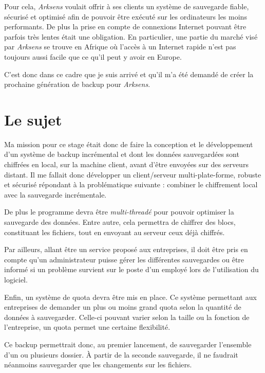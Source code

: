\documentclass[a4paper,10pt, twoside]{report}
\begin{document}
\begin{spacing}{1.2}
Pour cela, \textit{Arksens} voulait offrir \`a ses clients un syst\`eme de
sauvegarde fiable, s\'ecuris\'e et optimis\'e afin de pouvoir \^etre
ex\'ecut\'e sur les ordinateurs les moins performants. De plus la prise en
compte de connexions Internet pouvant \^etre parfois tr\`es lentes \'etait une
obligation. En particulier, une partie du march\'e vis\'e par \textit{Arksens}
se trouve en Afrique o\`u l'acc\`es \`a un Internet rapide n'est pas toujours
aussi facile que ce qu'il peut y avoir en Europe.

C'est donc dans ce cadre que je suis arriv\'e et qu'il m'a \'et\'e demand\'e
de cr\'eer la prochaine g\'en\'eration de backup pour \textit{Arksens}.

\section{Le sujet}
Ma mission pour ce stage \'etait donc de faire la conception et le
d\'eveloppement d'un syst\`eme de backup incr\'emental et dont les donn\'ees
sauvegard\'ees sont chiffr\'ees en local, sur la machine client, avant d'\^etre
envoy\'ees sur des serveurs distant. Il me fallait donc d\'evelopper un
client/serveur multi-plate-forme, robuste et s\'ecuris\'e r\'epondant \`a
la probl\'ematique suivante : combiner le chiffrement local avec la sauvegarde
incr\'ementale.

De plus le programme devra \^etre \textit{multi-thread\'e} pour pouvoir
optimiser la sauvegarde des donn\'ees. Entre autre, cela permettra de chiffrer
des blocs, constituant les fichiers, tout en envoyant au serveur ceux d\'ej\`a
chiffr\'es.

Par ailleurs, allant \^etre un service propos\'e aux entreprises, il doit \^etre
pris en compte qu'un administrateur puisse g\'erer les diff\'erentes
sauvegardes ou \^etre inform\'e si un probl\`eme survient sur le poste d'un
employ\'e lors de l'utilisation du logiciel.

Enfin, un syst\`eme de quota devra \^etre mis en place. Ce syst\`eme permettant
aux entreprises de demander un plus ou moins grand quota selon la quantit\'e de
donn\'ees \`a sauvegarder. Celle-ci pouvant varier selon la taille ou la
fonction de l'entreprise, un quota permet une certaine flexibilit\'e.

Ce backup permettrait donc, au premier lancement, de sauvegarder l'ensemble
d'un ou plusieurs dossier. \`A partir de la seconde sauvegarde, il ne faudrait
n\'eanmoins sauvegarder que les changements sur les fichiers.


\end{spacing}
\end{document}
